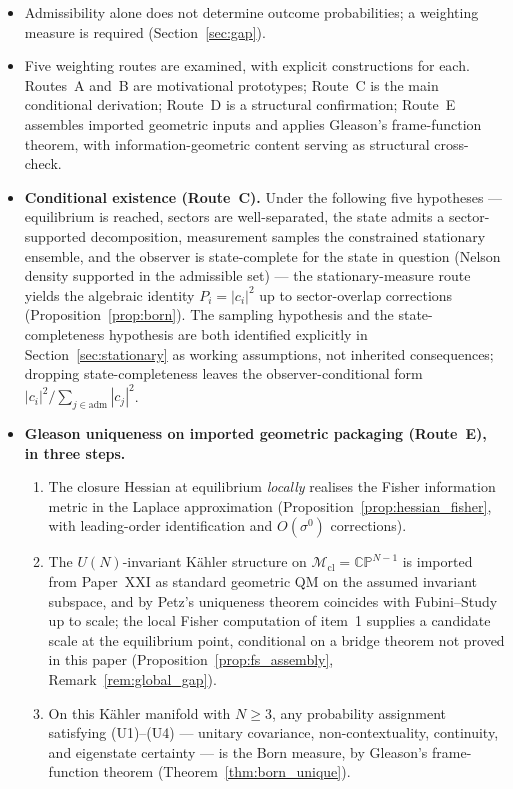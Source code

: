 \documentclass[12pt]{article}
\newcommand{\Mcl}{\mathcal{M}_{\mathrm{cl}}}
\begin{document}
\begin{itemize}
    \item Admissibility alone does not determine outcome probabilities; a weighting measure is required (Section~\ref{sec:gap}).
    \item Five weighting routes are examined, with explicit constructions for each. Routes~A and~B are motivational prototypes; Route~C is the main conditional derivation; Route~D is a structural confirmation; Route~E assembles imported geometric inputs and applies Gleason's frame-function theorem, with information-geometric content serving as structural cross-check.
    \item \textbf{Conditional existence (Route~C).} Under the following five hypotheses --- equilibrium is reached, sectors are well-separated, the state admits a sector-supported decomposition, measurement samples the constrained stationary ensemble, and the observer is state-complete for the state in question (Nelson density supported in the admissible set) --- the stationary-measure route yields the algebraic identity $P_i = |c_i|^2$ up to sector-overlap corrections (Proposition~\ref{prop:born}). The sampling hypothesis and the state-completeness hypothesis are both identified explicitly in Section~\ref{sec:stationary} as working assumptions, not inherited consequences; dropping state-completeness leaves the observer-conditional form $|c_i|^2/\sum_{j\in\mathrm{adm}}|c_j|^2$.
    \item \textbf{Gleason uniqueness on imported geometric packaging (Route~E), in three steps.}
    \begin{enumerate}
        \item The closure Hessian at equilibrium \emph{locally} realises the Fisher information metric in the Laplace approximation (Proposition~\ref{prop:hessian_fisher}, with leading-order identification and $O(\sigma^0)$ corrections).
        \item The $U(N)$-invariant K\"ahler structure on $\Mcl = \mathbb{CP}^{N-1}$ is imported from Paper~XXI as standard geometric QM on the assumed invariant subspace, and by Petz's uniqueness theorem coincides with Fubini--Study up to scale; the local Fisher computation of item~1 supplies a candidate scale at the equilibrium point, conditional on a bridge theorem not proved in this paper (Proposition~\ref{prop:fs_assembly}, Remark~\ref{rem:global_gap}).
        \item On this K\"ahler manifold with $N \geq 3$, any probability assignment satisfying (U1)--(U4) --- unitary covariance, non-contextuality, continuity, and eigenstate certainty --- is the Born measure, by Gleason's frame-function theorem (Theorem~\ref{thm:born_unique}).

\end{enumerate}
\end{itemize}
\end{document}
